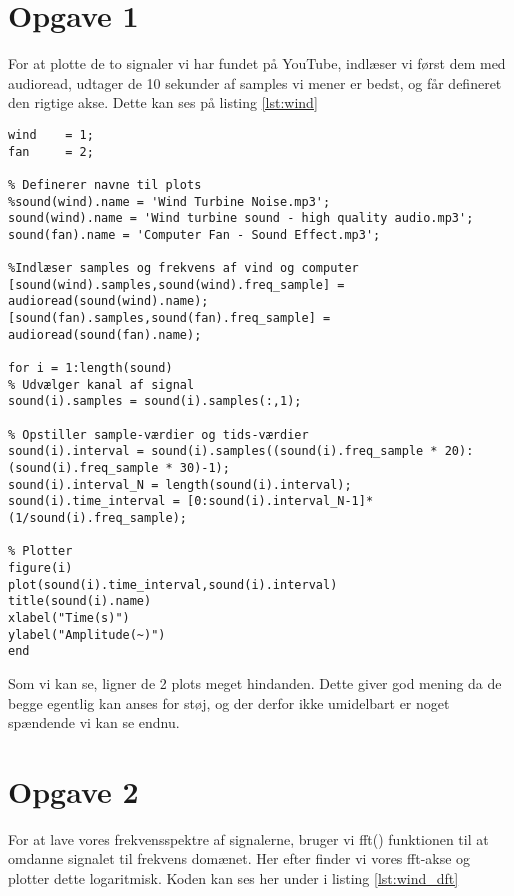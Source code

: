 \documentclass[../main.tex]{subfiles}
\begin{document}
\section{Opgave 1}

For at plotte de to signaler vi har fundet på YouTube, indlæser vi først dem med audioread, udtager de 10 sekunder af samples vi mener er bedst, og får defineret den rigtige akse. Dette kan ses på listing \ref{lst:wind}

\begin{lstlisting}[caption={Kode til at indlæse kvindmølle og computer blæsre lyde}, label={lst:wind}]
wind    = 1;
fan     = 2;

% Definerer navne til plots
%sound(wind).name = 'Wind Turbine Noise.mp3';
sound(wind).name = 'Wind turbine sound - high quality audio.mp3';
sound(fan).name = 'Computer Fan - Sound Effect.mp3';

%Indlæser samples og frekvens af vind og computer
[sound(wind).samples,sound(wind).freq_sample] = audioread(sound(wind).name);
[sound(fan).samples,sound(fan).freq_sample] = audioread(sound(fan).name);

for i = 1:length(sound)
% Udvælger kanal af signal
sound(i).samples = sound(i).samples(:,1);

% Opstiller sample-værdier og tids-værdier
sound(i).interval = sound(i).samples((sound(i).freq_sample * 20):(sound(i).freq_sample * 30)-1);
sound(i).interval_N = length(sound(i).interval);
sound(i).time_interval = [0:sound(i).interval_N-1]*(1/sound(i).freq_sample);

% Plotter
figure(i)
plot(sound(i).time_interval,sound(i).interval) 
title(sound(i).name)
xlabel("Time(s)")
ylabel("Amplitude(~)")
end
\end{lstlisting}



Som vi kan se, ligner de 2 plots meget hindanden. Dette giver god mening da de begge egentlig kan anses for støj, og der derfor ikke umidelbart er noget spændende vi kan se endnu.

\newpage
\section{Opgave 2}

For at lave vores frekvensspektre af signalerne, bruger vi fft() funktionen til at omdanne signalet til frekvens domænet. Her efter finder vi vores fft-akse og plotter dette logaritmisk. Koden kan ses her under i listing \ref{lst:wind_dft}
\end{document}

